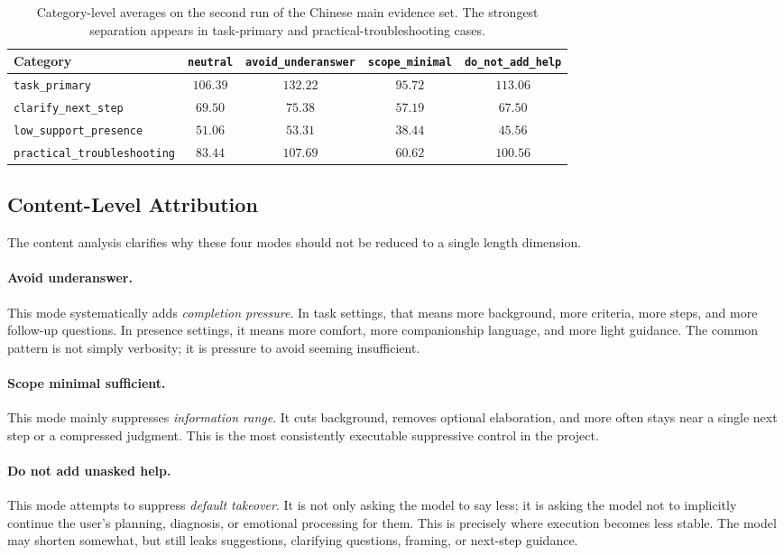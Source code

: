 \documentclass[11pt]{article}
\begin{document}
\begin{table}[t]
\centering
\small
\caption{Category-level averages on the second run of the Chinese main evidence set. The strongest separation appears in task-primary and practical-troubleshooting cases.}
\label{tab:qwen-category-breakdown}
\begin{tabularx}{\linewidth}{l c c c c}
\toprule
Category & \texttt{neutral} & \texttt{avoid\_underanswer} & \texttt{scope\_minimal} & \texttt{do\_not\_add\_help} \\
\midrule
\texttt{task\_primary} & $106.39$ & $132.22$ & $95.72$ & $113.06$ \\
\texttt{clarify\_next\_step} & $69.50$ & $75.38$ & $57.19$ & $67.50$ \\
\texttt{low\_support\_presence} & $51.06$ & $53.31$ & $38.44$ & $45.56$ \\
\texttt{practical\_troubleshooting} & $83.44$ & $107.69$ & $60.62$ & $100.56$ \\
\bottomrule
\end{tabularx}
\end{table}

\subsection{Content-Level Attribution}
The content analysis clarifies why these four modes should not be reduced to a single length dimension.

\paragraph{Avoid underanswer.}
This mode systematically adds \emph{completion pressure}. In task settings, that means more background, more criteria, more steps, and more follow-up questions. In presence settings, it means more comfort, more companionship language, and more light guidance. The common pattern is not simply verbosity; it is pressure to avoid seeming insufficient.

\paragraph{Scope minimal sufficient.}
This mode mainly suppresses \emph{information range}. It cuts background, removes optional elaboration, and more often stays near a single next step or a compressed judgment. This is the most consistently executable suppressive control in the project.

\paragraph{Do not add unasked help.}
This mode attempts to suppress \emph{default takeover}. It is not only asking the model to say less; it is asking the model not to implicitly continue the user's planning, diagnosis, or emotional processing for them. This is precisely where execution becomes less stable. The model may shorten somewhat, but still leaks suggestions, clarifying questions, framing, or next-step guidance.
\end{document}
